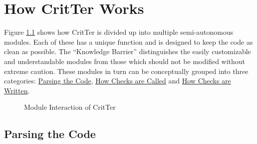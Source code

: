 \documentclass[12pt]{report}
\newcommand{\programName}{CritTer\xspace}
\begin{document}
\chapter{How \programName Works}

Figure \ref{moduleInteraction} shows how \programName is divided up into multiple semi-autonomous modules. Each of these has a unique function and is designed to keep the code as clean as possible. The ``Knowledge Barrier'' distinguishes the easily customizable and understandable modules from those which should not be modified without extreme caution. These modules in turn can be conceptually grouped into three categories: \hyperref[parsingTheCode]{Parsing the Code}, \hyperref[howChecksAreCalled]{How Checks are Called} and \hyperref[howChecksAreWritten]{How Checks are Written}.

\begin{figure}[h]
\caption{Module Interaction of \programName}
\label{moduleInteraction}
\begin{center}
\end{center}
\end{figure}


\section{Parsing the Code}
\label{parsingTheCode}
\end{document}
